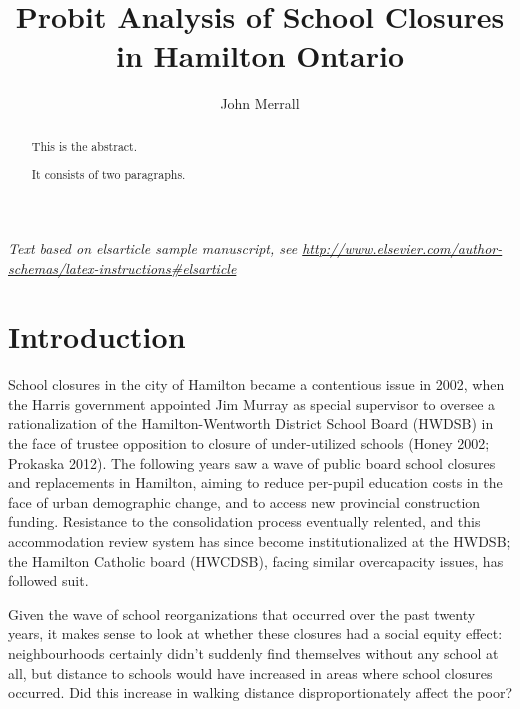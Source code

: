 \documentclass[]{elsarticle} %
\begin{document}
\begin{frontmatter}

  \title{Probit Analysis of School Closures in Hamilton Ontario}
    \author[School of Geography and Earth Sciences, McMaster University]{John Merrall}
      \address[School of Geography and Earth Sciences, McMaster University]{General Sciences Rm. 206, McMaster University, 1280 Main Street West,
Hamilton, Ontario L8S 4K1}
  
  \begin{abstract}
  This is the abstract.
  
  It consists of two paragraphs.
  \end{abstract}
  
 \end{frontmatter}

\emph{Text based on elsarticle sample manuscript, see
\url{http://www.elsevier.com/author-schemas/latex-instructions\#elsarticle}}

\hypertarget{introduction}{%
\section{Introduction}\label{introduction}}

School closures in the city of Hamilton became a contentious issue in
2002, when the Harris government appointed Jim Murray as special
supervisor to oversee a rationalization of the Hamilton-Wentworth
District School Board (HWDSB) in the face of trustee opposition to
closure of under-utilized schools (Honey 2002; Prokaska 2012). The
following years saw a wave of public board school closures and
replacements in Hamilton, aiming to reduce per-pupil education costs in
the face of urban demographic change, and to access new provincial
construction funding. Resistance to the consolidation process eventually
relented, and this accommodation review system has since become
institutionalized at the HWDSB; the Hamilton Catholic board (HWCDSB),
facing similar overcapacity issues, has followed suit.

Given the wave of school reorganizations that occurred over the past
twenty years, it makes sense to look at whether these closures had a
social equity effect: neighbourhoods certainly didn't suddenly find
themselves without any school at all, but distance to schools would have
increased in areas where school closures occurred. Did this increase in
walking distance disproportionately affect the poor?
\end{document}
